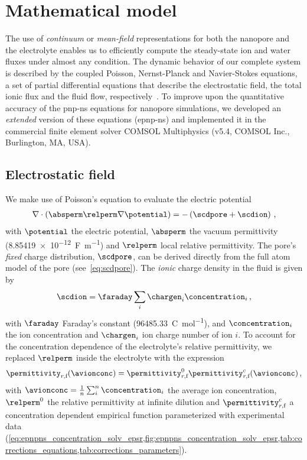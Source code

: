 \section{Mathematical model}
%
\label{sec:epnp-ns:model}
%

The use of \emph{continuum} or \emph{mean-field} representations for both the nanopore and the electrolyte
enables us to efficiently compute the steady-state ion and water fluxes under almost any condition. The
dynamic behavior of our complete system is described by the coupled Poisson, Nernst-Planck and Navier-Stokes
equations, a set of partial differential equations that describe the electrostatic field, the total ionic flux
and the fluid flow, respectively~\cite{Eisenberg-1996,Cervera-2005,Lu-2012}. To improve upon the quantitative
accuracy of the \gls{pnp-ns} equations for nanopore simulations, we developed an \emph{extended} version of
these equations ({\gls{epnp-ns}}) and implemented it in the commercial finite element solver {COMSOL}
Multiphysics (v5.4, COMSOL Inc., Burlington, MA, USA). 

\subsection{Electrostatic field}
%

We make use of Poisson's equation to evaluate the electric potential
%
\begin{align}
  \label{eq:poisson}
  \nabla \cdot \left(\absperm \relperm \nabla \potential \right) = -\left( \scdpore + \scdion \right)
  \text{\,,}
\end{align}
%
with $\potential$ the electric potential, $\absperm$ the vacuum permittivity
(\SI{8.85419e-12}{\farad\per\meter}) and $\relperm$ local relative permittivity. The pore's \emph{fixed}
charge distribution, $\scdpore$,  can be derived directly from the full atom model of the pore
(see~\cref{eq:scdpore}). The \emph{ionic} charge density in the fluid is given by
%
\begin{align}\label{eq:scdion}
  \scdion = \faraday\sum_{i}\chargen_{i}\concentration_{i}
  \text{\,,}
\end{align}
%
with $\faraday$ Faraday's constant (\SI{96485.33}{\coulomb\per\mole}), and $\concentration_{i}$ the ion
concentration and $\chargen_{i}$ ion charge number of ion $i$. To account for the concentration dependence of
the electrolyte's relative permittivity, we replaced $\relperm$ inside the electrolyte with the expression
%
\begin{align}
  \permittivity_{r,\text{f}}(\avionconc) =
        \permittivity_{r,\text{f}}^0 \permittivity_{r,\text{f}}^c(\avionconc)
  \text{\,,}
\end{align}
%
with $\avionconc=\frac{1}{n}\sum_{i}^{n}\concentration_{i}$ the average ion concentration, $\relperm^0$ the
relative permittivity at infinite dilution and $\permittivity_{r,\text{f}}^c$ a concentration dependent
empirical function parameterized with experimental data
(\cref{eq:epnpns_concentration_solv_epsr,fig:epnpns_concentration_solv_epsr,tab:corrections_equations,tab:corrections_parameters}).

